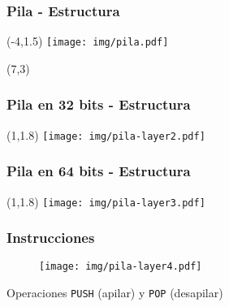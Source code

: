 \documentclass[aspectratio=169]{beamer}
\begin{document}
\begin{frame}
    \frametitle{Pila - Estructura}
    \begin{textblock}{5}(-4,1.5)
    \texttt{[image: img/pila.pdf]}
    \end{textblock}
    \begin{textblock}{9}(7,3)
    \vspace{1cm}
    \end{textblock}
\end{frame}

\begin{frame}
    \frametitle{Pila en 32 bits - Estructura}
    \begin{textblock}{5}(1,1.8)
    \texttt{[image: img/pila-layer2.pdf]}
    \end{textblock}
\end{frame}

\begin{frame}
    \frametitle{Pila en 64 bits - Estructura}
    \begin{textblock}{5}(1,1.8)
    \texttt{[image: img/pila-layer3.pdf]}
    \end{textblock}
\end{frame}

\begin{frame}
    \frametitle{Instrucciones}
    \begin{center}
    \vspace{-0.7cm}
    \begin{minipage}{1\textwidth}
    \begin{figure}
    \centering
    \texttt{[image: img/pila-layer4.pdf]}
    \end{figure}
    \end{minipage}
    Operaciones \texttt{PUSH} (apilar) y \texttt{POP} (desapilar)
    \end{center}
\end{frame}
\end{document}
